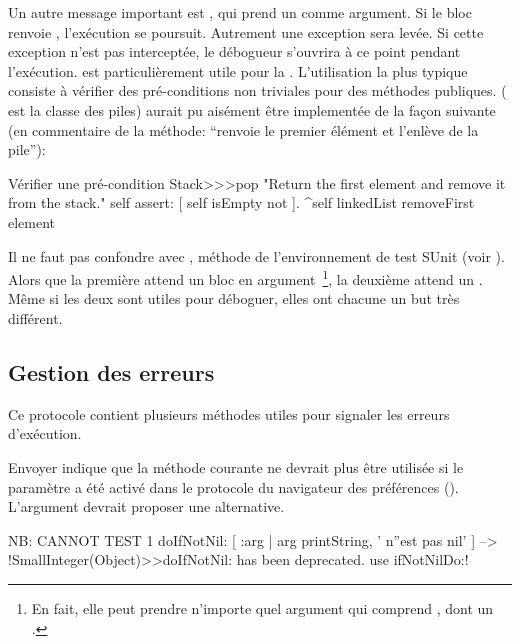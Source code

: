 \documentclass[a4paper,10pt,twoside]{book}
\begin{document}

Un autre message important est , qui prend un
 comme argument. Si le bloc renvoie , l'exécution
se poursuit. Autrement une exception sera levée. Si  cette exception
n'est pas interceptée, le débogueur s'ouvrira à ce point pendant
l'exécution.  est particulièrement utile pour la
. L'utilisation la plus typique
consiste à vérifier des pré-conditions non triviales pour des
méthodes publiques.  
( est la classe des piles)
aurait pu aisément être implementée de la façon suivante
(en commentaire de la méthode: ``renvoie le premier élément et
l'enlève de la pile''):

\begin{method}{Vérifier une pré-condition}
Stack>>>pop
    "Return the first element and remove it from the stack."
    self assert: [ self isEmpty not ].
    ^self linkedList removeFirst element
\end{method}

Il ne faut pas confondre  avec , 
méthode de l'environnement de test SUnit (voir ). Alors que la 
première attend un bloc en argument~\footnote{En fait, elle peut prendre n'importe quel argument qui comprend , dont un .}, la deuxième attend un . Même si les deux sont utiles pour déboguer, 
elles ont chacune un but très différent.

\subsection{Gestion des erreurs}

Ce protocole contient plusieurs méthodes utiles pour signaler les erreurs d'exécution.

Envoyer  indique que la méthode courante ne devrait plus être utilisée si le paramètre  a été activé dans le protocole  du navigateur des préférences ().
L'argument  devrait proposer une alternative.

\begin{code}{NB: CANNOT TEST}
1 doIfNotNil: [ :arg | arg printString, ' n''est pas nil' ]
	--> !SmallInteger(Object)>>doIfNotNil: has been deprecated. use ifNotNilDo:!
\end{code}
\end{document}

